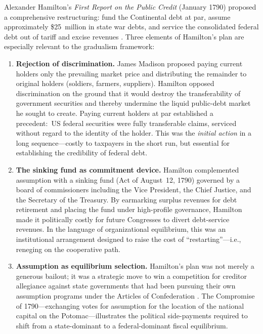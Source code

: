 \documentclass[12pt]{article}
\begin{document}
Alexander Hamilton's \textit{First Report on the Public Credit} (January
1790) proposed a comprehensive restructuring: fund the Continental debt
at par, assume approximately \$25~million in state war debts, and service
the consolidated federal debt out of tariff and excise revenues
\citep{Hamilton1790}.  Three elements of Hamilton's plan are especially
relevant to the gradualism framework:

\begin{enumerate}
  \item \textbf{Rejection of discrimination.}  James Madison proposed
    paying current holders only the prevailing market price and
    distributing the remainder to original holders (soldiers, farmers,
    suppliers).  Hamilton opposed discrimination on the ground that it
    would destroy the transferability of government securities and
    thereby undermine the liquid public-debt market he sought to create.
    Paying current holders at par established a precedent:\ US federal
    securities were fully transferable claims, serviced without regard to
    the identity of the holder.  This was the \emph{initial action} in a
    long sequence---costly to taxpayers in the short run, but essential
    for establishing the credibility of federal debt.

  \item \textbf{The sinking fund as commitment device.}  Hamilton
    complemented assumption with a sinking fund (Act of August~12, 1790)
    governed by a board of commissioners including the Vice President,
    the Chief Justice, and the Secretary of the Treasury.  By earmarking
    surplus revenues for debt retirement and placing the fund under
    high-profile governance, Hamilton made it politically costly for
    future Congresses to divert debt-service revenues. In the language
    of organizational equilibrium, this was an institutional arrangement
    designed to raise the cost of ``restarting''---i.e., reneging on the
    cooperative path.

  \item \textbf{Assumption as equilibrium selection.}  Hamilton's plan
    was not merely a generous bailout; it was a strategic move to win a
    competition for creditor allegiance against state governments that
    had been pursuing their own assumption programs under the Articles
    of Confederation \citep{Ferguson1961, Rothbard2019}.  The Compromise
    of 1790---exchanging votes for assumption for the location of the
    national capital on the Potomac---illustrates the political
    side-payments required to shift from a state-dominant to a
    federal-dominant fiscal equilibrium.
\end{enumerate}
\end{document}
